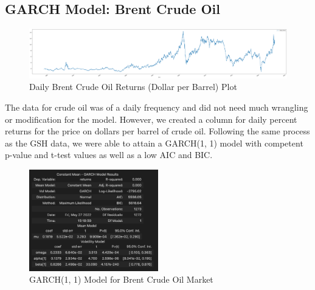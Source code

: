 \subsection{GARCH Model: Brent Crude Oil}
\begin{figure}[H]
    \centering
    \includegraphics[width=1.0\textwidth]{Figures/Garch/brent.png}
    \caption{Daily Brent Crude Oil Returns (Dollar per Barrel) Plot}
    \label{fig:Results_table}
\end{figure}
The data for crude oil was of a daily frequency and did not need much wrangling or modification for the model. However, we created a column for daily percent returns for the price on dollars per barrel of crude oil. Following the same process as the GSH data, we were able to attain a GARCH(1, 1) model with competent p-value and t-test values as well as a low AIC and BIC. 
\medskip

\begin{figure}[H]
    \centering
    \includegraphics[width=0.5\textwidth]{Figures/Garch/crude.png}
    \caption{GARCH(1, 1) Model for Brent Crude Oil Market}
    \label{fig:Results_table}
\end{figure}

